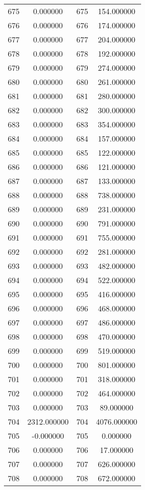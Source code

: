 \documentclass[12pt]{article}
\begin{document}
\begin{longtable}{@{}cccc@{}}
675 & 0.000000 & 675 & 154.000000 \\
676 & 0.000000 & 676 & 174.000000 \\
677 & 0.000000 & 677 & 204.000000 \\
678 & 0.000000 & 678 & 192.000000 \\
679 & 0.000000 & 679 & 274.000000 \\
680 & 0.000000 & 680 & 261.000000 \\
681 & 0.000000 & 681 & 280.000000 \\
682 & 0.000000 & 682 & 300.000000 \\
683 & 0.000000 & 683 & 354.000000 \\
684 & 0.000000 & 684 & 157.000000 \\
685 & 0.000000 & 685 & 122.000000 \\
686 & 0.000000 & 686 & 121.000000 \\
687 & 0.000000 & 687 & 133.000000 \\
688 & 0.000000 & 688 & 738.000000 \\
689 & 0.000000 & 689 & 231.000000 \\
690 & 0.000000 & 690 & 791.000000 \\
691 & 0.000000 & 691 & 755.000000 \\
692 & 0.000000 & 692 & 281.000000 \\
693 & 0.000000 & 693 & 482.000000 \\
694 & 0.000000 & 694 & 522.000000 \\
695 & 0.000000 & 695 & 416.000000 \\
696 & 0.000000 & 696 & 468.000000 \\
697 & 0.000000 & 697 & 486.000000 \\
698 & 0.000000 & 698 & 470.000000 \\
699 & 0.000000 & 699 & 519.000000 \\
700 & 0.000000 & 700 & 801.000000 \\
701 & 0.000000 & 701 & 318.000000 \\
702 & 0.000000 & 702 & 464.000000 \\
703 & 0.000000 & 703 & 89.000000 \\
704 & 2312.000000 & 704 & 4076.000000 \\
705 & -0.000000 & 705 & 0.000000 \\
706 & 0.000000 & 706 & 17.000000 \\
707 & 0.000000 & 707 & 626.000000 \\
708 & 0.000000 & 708 & 672.000000 \\

\end{longtable}
\end{document}
